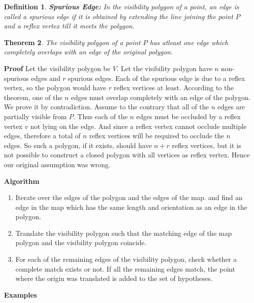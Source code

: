 \documentclass[a4paper,10pt]{article}
\newtheorem{theorem}{Theorem}
\newtheorem{definition}[theorem]{Definition}
\begin{document}
\begin{definition}
 {\bf Spurious Edge:} In the visibility polygon of a point, an edge is called a spurious edge if it is obtained by extending the line
 joining the point $P$ and a reflex vertex till it meets the polygon.
\end{definition}


\begin{theorem}
 The visibility polygon of a point $P$ has atleast one edge which completely overlaps with an edge of the original polygon.
\end{theorem}
{\bf Proof} Let the visibility polygon be $V$. Let the visibility polygon have $n$ non-spurious edges and $r$ spurious edges.
Each of the spurious edge is due to a reflex vertex, so the polygon would have $r$ reflex vertices at least.
 According to the theorem, one of the $n$ edges must overlap completely with an edge of the polygon.
We prove it by contradiction. Assume to the contrary that all of the $n$ edges are partially visible from $P$. Thus each of the $n$
edges must be occluded by a reflex vertex $v$ not lying on the edge. And since a reflex vertex cannot occlude multiple edges, therefore
 a total of $n$ reflex vertices will be required to occlude the $n$ edges.
So such a polygon, if it exists, should have $n+r$ reflex vertices, but it is not possible to construct a closed polygon with all
 vertices as reflex vertex.
Hence our original assumption was wrong.

{\bf Algorithm}

\begin{enumerate}
 \item Iterate over the edges of the polygon and the edges of the map. and find an edge in the map which has the same length and
 orientation as an edge in the polygon.

 \item
 Translate the visibility polygon such that the matching edge of the map polygon
and the visibility polygon coincide.

 \item
 For each of the remaining edges of the visibility polygon, check whether a 
complete match exists or not. If all the remaining edges match, the point where the
origin was translated is added to the set of hypotheses.

\end{enumerate}

\newpage

{\bf Examples}
\end{document}
